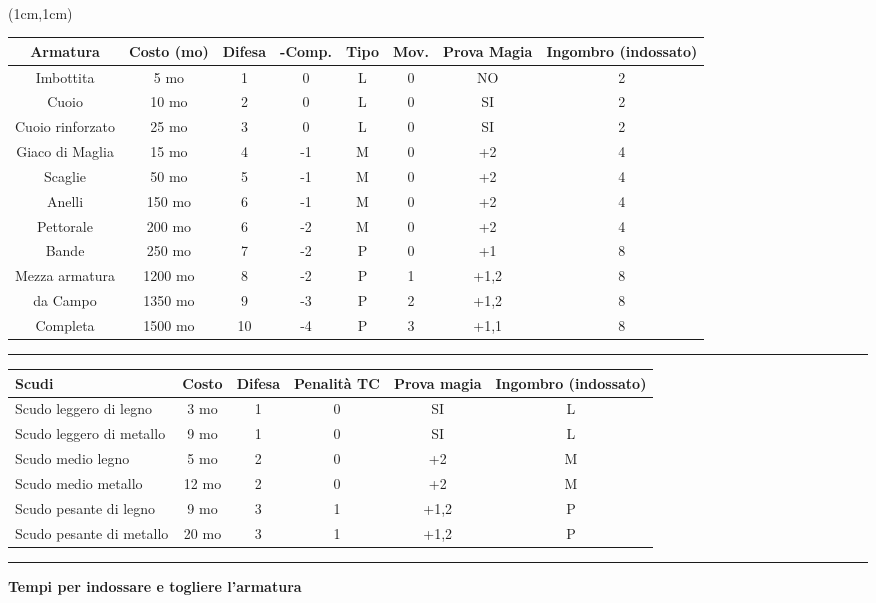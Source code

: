 \documentclass[a4paper,12 pt,openany]{book}
\newcommand{\riga}{\rule{\textwidth}{0.4pt}}
\begin{document}
~\newpage

\begin{textblock*}{18cm}(1cm,1cm) %

\begin{tabular}{cccccccc}
\textbf{Armatura} & \textbf{Costo (mo)} & \textbf{Difesa} & \textbf{-Comp.} &  \textbf{Tipo} & \textbf{Mov.} & \textbf{Prova Magia}&\textbf{Ingombro (indossato)}\\
\hline
Imbottita & 5 mo & 1 & 0 & L & 0 & NO&2\\
Cuoio & 10 mo & 2 & 0  & L & 0 & SI&2\\
Cuoio rinforzato& 25 mo  & 3  & 0   & L & 0 & SI&2\\
Giaco di Maglia & 15 mo & 4  & -1  & M & 0 &+2&4\\
Scaglie& 50 mo & 5  & -1  & M & 0 &+2&4\\
Anelli & 150 mo & 6  & -1  & M & 0 &+2&4\\
Pettorale  & 200 mo & 6  & -2  & M & 0 &+2&4\\
Bande & 250 mo & 7  & -2  & P & 0 &+1&8\\
Mezza armatura  & 1200 mo& 8  & -2  & P & 1 &+1,2&8\\
da Campo& 1350 mo& 9  & -3  & P & 2 &+1,2&8\\
Completa& 1500 mo& 10 & -4  & P & 3 &+1,1&8\\
\end{tabular}

\riga

\begin{tabular}{lccccc}
\textbf{Scudi} & \textbf{Costo} & \textbf{Difesa} & \textbf{Penalità TC} & \textbf{Prova magia} &  \textbf{Ingombro (indossato)}\\
\hline
Scudo leggero di legno 	 & 	3 mo  	&  1	& 0& SI	  	& L\\
Scudo leggero di metallo & 	9 mo  	&  1	& 0& SI	  	& L\\
Scudo medio legno		 &	5 mo 	&  2	& 0& +2		& M\\
Scudo medio metallo	 	 &	12 mo  	&  2  	& 0& +2  	& M\\
Scudo pesante di legno   & 	9  mo  	&  3 	& 1& +1,2  	& P\\
Scudo pesante di metallo & 	20 mo  	&  3	& 1& +1,2  	& P\\
\end{tabular}

\riga

\textbf{Tempi per indossare e togliere l'armatura}\\


\end{textblock*}
\end{document}
